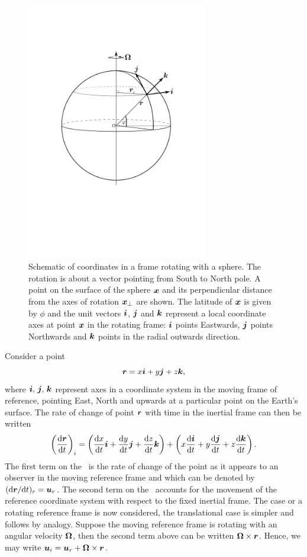 \begin{figure}\label{fig:rotating_frame}
\centering
\includegraphics[width=8.0cm]{misc_images/coordinates.pdf}
\caption{Schematic of coordinates in a frame rotating with a sphere. The rotation is about a vector
pointing from South to North pole. A point on the surface of the sphere ${\mbox{\boldmath$x$}}$ and its perpendicular
distance from the axes of rotation ${\mbox{\boldmath$x$}}_{\perp}$ are shown. The latitude of ${\mbox{\boldmath$x$}}$ is given by $\phi$ 
and the unit vectors ${\mbox{\boldmath$i$}}$, ${\mbox{\boldmath$j$}}$ and ${\mbox{\boldmath$k$}}$ represent a local coordinate axes at point ${\mbox{\boldmath$x$}}$ in the rotating
frame: ${\mbox{\boldmath$i$}}$ points Eastwards, ${\mbox{\boldmath$j$}}$ points Northwards and ${\mbox{\boldmath$k$}}$ points in the radial outwards direction.}
\end{figure}

Consider a point
\begin{equation*}
{\mbox{\boldmath$r$}} = x{\mbox{\boldmath$i$}} + y{\mbox{\boldmath$j$}} + z{\mbox{\boldmath$k$}},
\end{equation*}
where ${\mbox{\boldmath$i$}},\,{\mbox{\boldmath$j$}},\,{\mbox{\boldmath$k$}}$ represent axes in a coordinate system in the moving frame of
reference, \eg pointing East, North and upwards at a particular point on the Earth's surface.
The rate of change of point ${\mbox{\boldmath$r$}}$ with time in the inertial frame can then be written
\begin{equation*}
\left(\frac{\mathrm{d}{\mbox{\boldmath$r$}}}{\mathrm{d} t}\right)_i=\left(\frac{\mathrm{d} x}{\mathrm{d} t}{\mbox{\boldmath$i$}}+\frac{\mathrm{d} y}{\mathrm{d} t}{\mbox{\boldmath$j$}}+\frac{\mathrm{d} z}{\mathrm{d} t}{\mbox{\boldmath$k$}}\right)
+\left(x\frac{\mathrm{d}{\mbox{\boldmath$i$}}}{\mathrm{d} t}+y\frac{\mathrm{d}{\mbox{\boldmath$j$}}}{\mathrm{d} t}+z\frac{\mathrm{d}{\mbox{\boldmath$k$}}}{\mathrm{d} t}\right).
\end{equation*}
The first term on the \rhs\ is the rate of change of the point as it appears
to an observer in the moving reference frame and which can be denoted by
$(\mathrm{d}{\mbox{\boldmath$r$}}/\mathrm{d} t)_r={\mbox{\boldmath$u$}}_r$.
The second term on the \rhs\ accounts for the movement of the reference coordinate system
with respect to the fixed inertial frame. The case or a rotating reference frame is now considered,
the translational case is simpler and follows by analogy. Suppose the moving reference frame is
rotating with an angular velocity ${\mbox{\boldmath$\Omega$}}$, then the second term above can be written ${\mbox{\boldmath$\Omega$}}\times{\mbox{\boldmath$r$}}$.
Hence, we may write ${\mbox{\boldmath$u$}}_i={\mbox{\boldmath$u$}}_r+{\mbox{\boldmath$\Omega$}}\times{\mbox{\boldmath$r$}}$.

